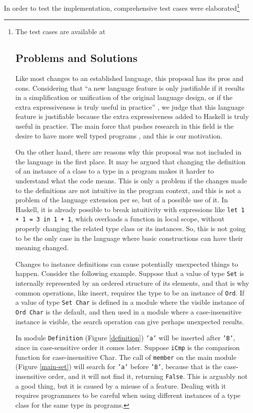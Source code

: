 \documentclass[msc]{ppgccufmg}
\begin{document}
In order to test the implementation, comprehensive test cases were elaborated\footnote{The test cases are available at 

\section{Problems and Solutions}
\label{problems}
Like most changes to an established language, this proposal has
its pros and cons.  Considering that ``a new language feature is only
justifiable if it results in a simplification or unification of the
original language design, or if the extra expressiveness is truly
useful in practice'' \citep[p.~1]{tc}, we judge that this language
feature is justifiable because the extra expressiveness added to
Haskell is truly useful in practice.  The main force that pushes
research in this field is the desire to have more well typed programs
\citep[p.~3]{pierce}, and this is our motivation.

On the other hand, there are reasons why this proposal was not included in the
language in the first place.  
It may be argued that changing the definition of
an instance of a class to a type in a program makes it harder to understand
what the code means.  
This is only a problem if the changes made to the
definitions are not intuitive in the program context, and this is not a problem
of the language extension per se, but of a possible use of it.  In Haskell,
it is already possible to break intuitivity with expressions like \texttt{let 1 + 1 = 3
in 1 + 1}, which overloads a function in local scope, without properly changing
the related type class or its instances.  So, this is not going to be the only
case in the language where basic constructions can have their meaning changed.

Changes to instance definitions can cause potentially unexpected
things to happen. Consider the following example. Suppose that a value
of type \texttt{Set} is internally represented by an ordered structure
of its elements, and that is why common operations, like insert,
requires the type to be an instance of \texttt{Ord}.  If a value of
type \texttt{Set Char} is defined in a module where the visible
instance of \texttt{Ord Char} is the default, and then used in a
module where a case-insensitive instance is visible, the search
operation can give perhaps unexpected results.

In module \texttt{Definition} (Figure \ref{definition}) \texttt{'a'}
will be inserted after \texttt{'B'}, since in case-sensitive order it
comes later.  Suppose \texttt{iCmp} is the comparison function
for case-insensitive Char.  The call of \texttt{member} on the main module
(Figure
\ref{main-set}) will search for \texttt{'a'} before \texttt{'B'},
because that is the case-insensitive order, and it will not find it,
returning \texttt{False}.  This is arguably not a good thing, but it is caused
by a misuse of a
feature. Dealing with it requires programmers to be careful when using
different instances of a type class for the same type in programs.

}
\end{document}
